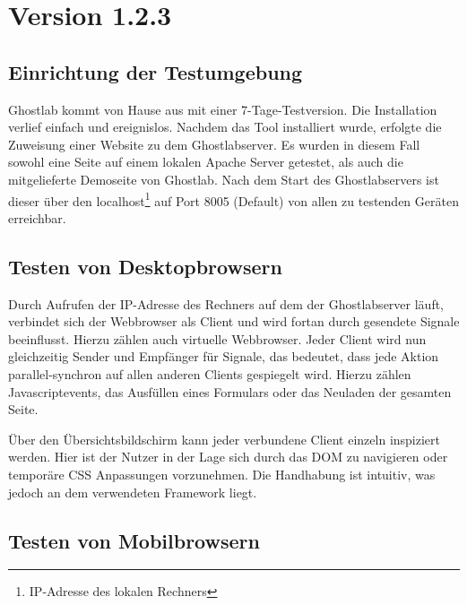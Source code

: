	\section{ Version 1.2.3}
		\subsection {Einrichtung der Testumgebung}
		Ghostlab kommt von Hause aus mit einer 7-Tage-Testversion. Die Installation verlief einfach und ereignislos. Nachdem das Tool installiert wurde, erfolgte die Zuweisung einer Website zu dem Ghostlabserver. Es wurden in diesem Fall sowohl eine Seite auf einem lokalen \Gls{Apache} Server getestet, als auch die mitgelieferte Demoseite von Ghostlab. Nach dem Start des Ghostlabservers ist dieser über den localhost\footnote{IP-Adresse des lokalen Rechners} auf Port 8005 (Default) von allen zu testenden Geräten erreichbar.
		
		\subsection{Testen von Desktopbrowsern}
		Durch Aufrufen der IP-Adresse des Rechners auf dem der Ghostlabserver läuft, verbindet sich der \Gls{Webbrowser} als Client und wird fortan durch gesendete Signale beeinflusst. Hierzu zählen auch virtuelle \Gls{Webbrowser}. Jeder Client wird nun gleichzeitig Sender und Empfänger für Signale, das bedeutet, dass jede Aktion \gls{parallel-synchron} auf allen anderen Clients gespiegelt wird. Hierzu zählen \Gls{Javascript}events, das Ausfüllen eines Formulars oder das Neuladen der gesamten Seite.
		
		Über den Übersichtsbildschirm kann jeder verbundene Client einzeln inspiziert werden. Hier ist der Nutzer in der Lage sich durch das \Gls{DOM} zu navigieren oder temporäre CSS Anpassungen vorzunehmen. Die Handhabung ist intuitiv, was jedoch an dem verwendeten \Gls{Framework}  liegt.
		
		\pagebreak
		\subsection{Testen von Mobilbrowsern}
		

